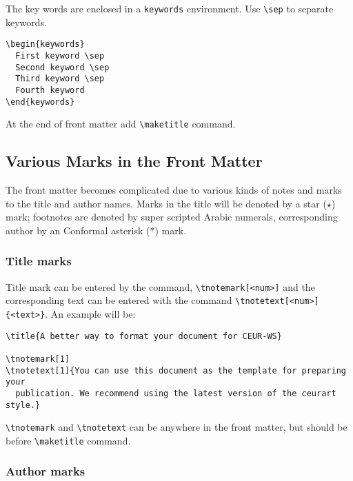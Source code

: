 \documentclass[
 twocolumn,
 hf,
]{ceurart}
\begin{document}
The key words are enclosed in a \verb|keywords|
environment. Use \verb|\sep| to separate keywords.

\begin{lstlisting}
\begin{keywords}
  First keyword \sep 
  Second keyword \sep 
  Third keyword \sep 
  Fourth keyword
\end{keywords}
\end{lstlisting}

At the end of front matter add \verb|\maketitle| command.

\subsection{Various Marks in the Front Matter}

The front matter becomes complicated due to various kinds
of notes and marks to the title and author names. Marks in
the title will be denoted by a star ($\star$) mark;
footnotes are denoted by super scripted Arabic numerals,
corresponding author by an Conformal asterisk (*) mark.

\subsubsection{Title marks}

Title mark can be entered by the command, \verb|\tnotemark[<num>]|
and the corresponding text can be entered with the command
\verb|\tnotetext[<num>]{<text>}|. An example will be:

\begin{lstlisting}
\title{A better way to format your document for CEUR-WS}

\tnotemark[1]
\tnotetext[1]{You can use this document as the template for preparing your
  publication. We recommend using the latest version of the ceurart style.}
\end{lstlisting}

\verb|\tnotemark| and \verb|\tnotetext| can be anywhere in
the front matter, but should be before \verb|\maketitle| command.

\subsubsection{Author marks}
\end{document}
